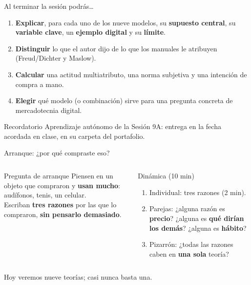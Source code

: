 \documentclass[aspectratio=169,xcolor=dvipsnames]{beamer}
\begin{document}
\begin{frame}{Al terminar la sesión podrás\ldots}
\begin{enumerate}
  \item \textbf{Explicar}, para cada uno de los nueve modelos, su \textbf{supuesto central}, su \textbf{variable clave}, un \textbf{ejemplo digital} y su \textbf{límite}.
    \item \textbf{Distinguir} lo que el autor dijo de lo que los manuales le atribuyen (Freud/Dichter y Maslow).
    \item \textbf{Calcular} una actitud multiatributo, una norma subjetiva y una intención de compra a mano.
    \item \textbf{Elegir} qué modelo (o combinación) sirve para una pregunta concreta de mercadotecnia digital.
\end{enumerate}
\begin{alertblock}{Recordatorio}
  Aprendizaje autónomo de la Sesión 9A: entrega en la fecha acordada en clase, en su carpeta del portafolio.
\end{alertblock}
\end{frame}

\begin{frame}{Arranque: ¿por qué compraste eso?}
\begin{columns}[T]
  \begin{exampleblock}{Pregunta de arranque}
    Piensen en un objeto que compraron y \textbf{usan mucho}: audífonos, tenis, un celular.\\[4pt]
    Escriban \textbf{tres razones} por las que lo compraron, \textbf{sin pensarlo demasiado}.
  \end{exampleblock}
  \begin{block}{Dinámica (10 min)}
    \small
    \begin{enumerate}
      \item Individual: tres razones (2 min).
      \item Parejas: ¿alguna razón es \textbf{precio}? ¿alguna es \textbf{qué dirían los demás}? ¿alguna es \textbf{hábito}?
      \item Pizarrón: ¿todas las razones caben en \textbf{una sola} teoría?
    \end{enumerate}
  \end{block}
\end{columns}
\vspace{2pt}
{\small\color{IPNgris} Hoy veremos nueve teorías; casi nunca basta una.}
\end{frame}
\end{document}
